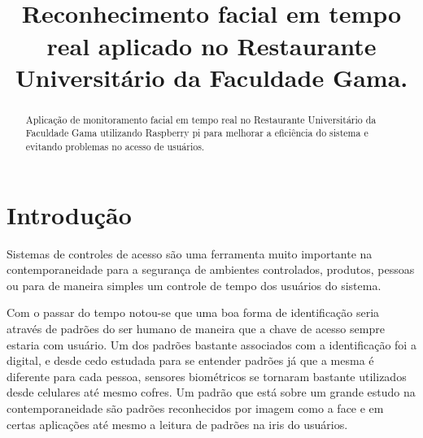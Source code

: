 \documentclass[conference,compsoc]{IEEEtran}
\begin{document}
\title{\\Reconhecimento facial em tempo real aplicado no Restaurante Universitário da Faculdade Gama.}



\author{
\and
{}
}
\maketitle


\begin{abstract}
Aplicação de monitoramento facial em tempo real no Restaurante Universitário da Faculdade Gama utilizando Raspberry pi para melhorar a eficiência do sistema e evitando problemas no acesso de usuários. \cite{referencia:3} 
\end{abstract}
\IEEEpeerreviewmaketitle
\section{Introdução}
Sistemas de controles de acesso são uma ferramenta muito importante na contemporaneidade para a segurança de ambientes controlados, produtos, pessoas ou para de maneira simples um controle de tempo dos usuários do sistema. \cite{referencia:7}

Com o passar do tempo notou-se que uma boa forma de identificação seria através de padrões do ser humano de maneira que a chave de acesso sempre estaria com usuário. Um dos padrões bastante associados com a identificação foi a digital, e desde cedo estudada para se entender padrões já que a  mesma é diferente para cada pessoa, sensores biométricos se tornaram bastante utilizados desde celulares até mesmo cofres. Um padrão que está sobre um grande estudo na contemporaneidade são padrões reconhecidos por imagem como a face e em certas aplicações até mesmo a leitura de padrões na iris do usuários.\cite{referencia:7}
\end{document}
